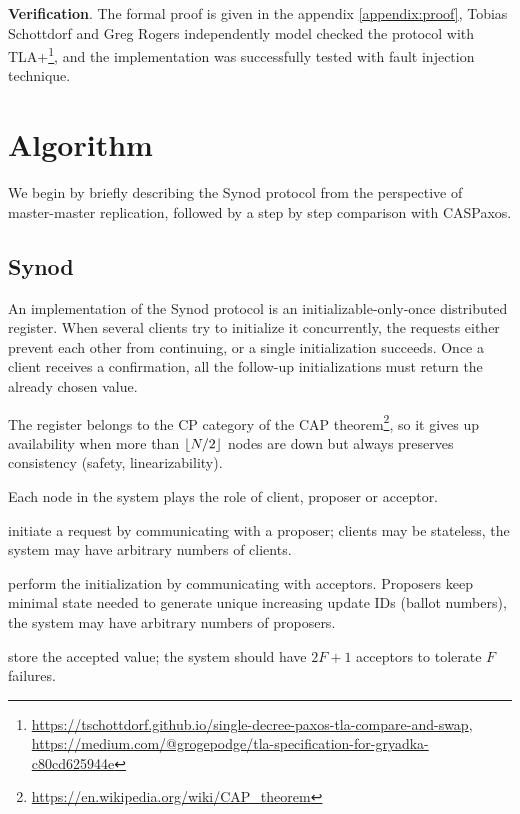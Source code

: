 \documentclass[12pt]{article}
\theoremstyle{definition}
\DeclarePairedDelimiter{\floor}{\lfloor}{\rfloor}
\begin{document}
{\bf Verification}. The formal proof is given in the appendix \ref{appendix:proof}, Tobias Schottdorf and Greg Rogers independently model checked the protocol with TLA+\footnote{\href{https://tschottdorf.github.io/single-decree-paxos-tla-compare-and-swap}{https://tschottdorf.github.io/single-decree-paxos-tla-compare-and-swap}, \href{https://medium.com/@grogepodge/tla-specification-for-gryadka-c80cd625944e}{https://medium.com/@grogepodge/tla-specification-for-gryadka-c80cd625944e}}, and the implementation was successfully tested with fault injection technique.

\section{Algorithm}

We begin by briefly describing the Synod protocol from the perspective of master-master replication, followed by a step by step comparison with CASPaxos.

\subsection{Synod}

An implementation of the Synod protocol is an initializable-only-once distributed register. When several clients try to initialize it concurrently, the requests either prevent each other from continuing, or a single initialization succeeds. Once a client receives a confirmation, all the follow-up initializations must return the already chosen value.

The register belongs to the CP category of the CAP theorem\footnote{\href{https://en.wikipedia.org/wiki/CAP\_theorem}{https://en.wikipedia.org/wiki/CAP\_theorem}}, so it gives up availability when more than $\floor{N/2}$ nodes are down but always preserves consistency (safety, linearizability).

Each node in the system plays the role of client, proposer or acceptor.

\begin{description}[align=left]
  \item [Clients] initiate a request by communicating with a proposer; clients may be stateless, the system may have arbitrary numbers of clients.
  \item [Proposers] perform the initialization by communicating with acceptors. Proposers keep minimal state needed to generate unique increasing update IDs (ballot numbers), the system may have arbitrary numbers of proposers.
  \item [Acceptors] store the accepted value; the system should have $2F+1$ acceptors to tolerate $F$ failures.
\end{description}
\end{document}

